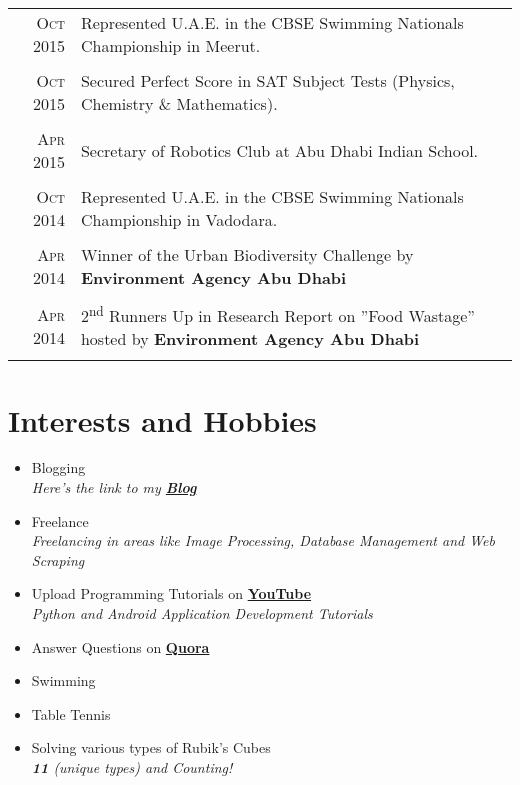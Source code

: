\documentclass[a4paper,10pt]{article}
\begin{document}
\begin{tabular}{r|p{13.7cm}}
\textsc{Oct} 2015 & Represented U.A.E. in the CBSE Swimming Nationals Championship in Meerut.\\\multicolumn{2}{c}{}\\
\textsc{Oct} 2015 & Secured Perfect Score in SAT Subject Tests (Physics, Chemistry \& Mathematics).\\\multicolumn{2}{c}{}\\
\textsc{Apr} 2015 & Secretary of Robotics Club at Abu Dhabi Indian School. \\\multicolumn{2}{c}{}\\
\textsc{Oct} 2014 & Represented U.A.E. in the CBSE Swimming Nationals Championship in Vadodara.  \\\multicolumn{2}{c}{}\\
\textsc{Apr} 2014 & Winner of the Urban Biodiversity Challenge by \textbf{Environment Agency Abu Dhabi} \\\multicolumn{2}{c}{}\\
\textsc{Apr} 2014 & 2\textsuperscript{nd} Runners Up in Research Report on ''Food Wastage'' hosted by \textbf{Environment Agency Abu Dhabi} \\\multicolumn{2}{c}{}\\
\end{tabular}

\newpage

\section{Interests and Hobbies}
\begin{itemize}
  \item Blogging \\
  \emph{\small{Here's the link to my \href{https://medium.com/@yashitmaheshwary}{\textbf{Blog}}}}
  \item Freelance \\
  \emph{\small{Freelancing in areas like Image Processing, Database Management and Web Scraping}}
  \item Upload Programming Tutorials on \href{https://www.youtube.com/channel/UC5A8roRFNDmhw4jNKiQqWnQ}{\textbf{YouTube}} \\
  \emph{\small{Python and Android Application Development Tutorials}}
  \item Answer Questions on \href{https://www.quora.com/profile/Yashit-Maheshwary}{\textbf{Quora}}
  \item Swimming
  \item Table Tennis
  \item Solving various types of Rubik's Cubes \\
  \emph{\normalsize{\textbf{11}} \small{(unique types) and Counting!}}
\end{itemize}
\end{document}
